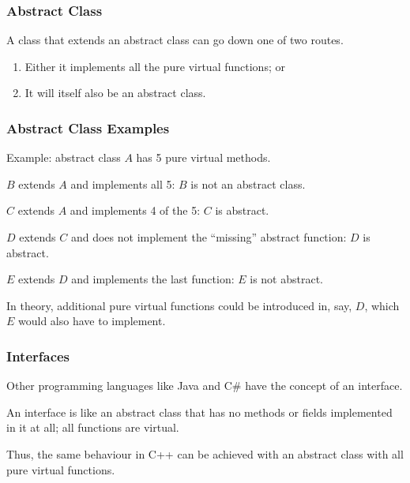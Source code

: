 \begin{frame}
\frametitle{Abstract Class}

A class that extends an abstract class can go down one of two routes.

\begin{enumerate}
	\item Either it implements all the pure virtual functions; or
	\item It will itself also be an abstract class.
\end{enumerate}


\end{frame}



\begin{frame}
\frametitle{Abstract Class Examples}

Example: abstract class $A$ has 5 pure virtual methods. 

$B$ extends $A$ and implements all 5: $B$ is not an abstract class.

$C$ extends $A$ and implements 4 of the 5: $C$ is abstract.

$D$ extends $C$ and does not implement the ``missing'' abstract function: $D$ is abstract.

$E$ extends $D$ and implements the last function: $E$ is not abstract.

In theory, additional pure virtual functions could be introduced in, say, $D$, which $E$ would also have to implement.

\end{frame}



\begin{frame}
\frametitle{Interfaces}

Other programming languages like Java and C\# have the concept of an \alert{interface}.

An interface is like an abstract class that has no methods or fields implemented in it at all; all functions are virtual.

Thus, the same behaviour in C++ can be achieved with an abstract class with all pure virtual functions.

\end{frame}





